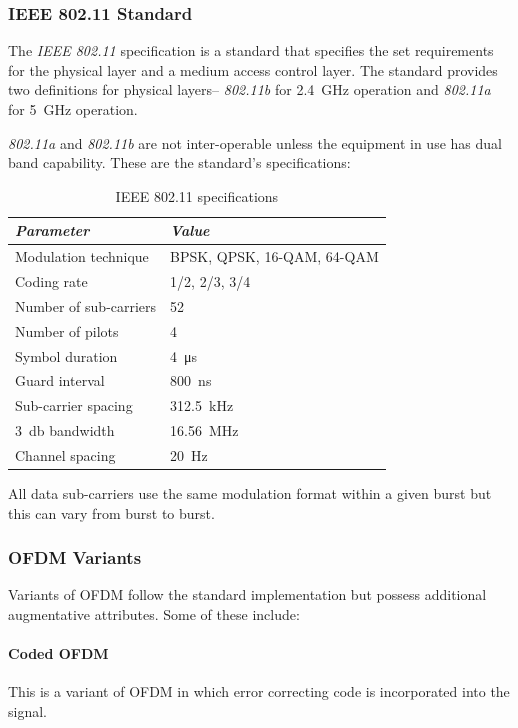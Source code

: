 \subsubsection{IEEE 802.11 Standard}
The \emph{IEEE 802.11} specification is a standard that specifies the set requirements for the physical layer and a medium access control layer. The standard provides two definitions for physical layers-- \emph{802.11b} for \SI{2.4}{\giga\hertz} operation and \emph{802.11a} for \SI{5}{\giga\hertz} operation\cite{802.11}.

\emph{802.11a} and \emph{802.11b} are not inter-operable unless the equipment in use has dual band capability. These are the standard's specifications:
\begin{table}[!h]
	\centering
	\renewcommand{\arraystretch}{1.5}
	\begin{tabular}{l l}
		\emph{Parameter} & \emph{Value}\\
		\hline
		Modulation technique & BPSK, QPSK, 16-QAM, 64-QAM \\
		Coding rate & 1/2, 2/3, 3/4 \\
		Number of sub-carriers & 52 \\
		Number of pilots & 4 \\
		Symbol duration & \SI{4}{\micro\second} \\
		Guard interval & \SI{800}{\nano\second} \\
		Sub-carrier spacing & \SI{312.5}{\kilo\hertz} \\
		\SI{3}{\decibel} bandwidth & \SI{16.56}{\mega\hertz} \\
		Channel spacing & \SI{20}{\hertz}
	\end{tabular}
	\caption{IEEE 802.11 specifications}
	\label{tab:litRev:802.11}
\end{table}

\noindent All data sub-carriers use the same modulation format within a given burst but this can vary from burst to burst.

\subsubsection{OFDM Variants}
Variants of OFDM follow the standard implementation but possess additional augmentative attributes. Some of these include:
\paragraph{Coded OFDM} This is a variant of OFDM in which error correcting code is incorporated into the signal.
